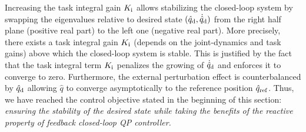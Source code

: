 Increasing the task integral gain $K_{\rm i}$ allows stabilizing the closed-loop system by swapping the eigenvalues relative to desired state $(\hat{q}_{\rm d}, \dot{\hat{q}}_{\rm d})$ from the right half plane (positive real part) to the left one (negative real part). More precisely, there exists a task integral gain $K_{\rm i}$ (depends on the joint-dynamics and task gains) above which the closed-loop system is stable. This is justified by the fact that the task integral term $K_{\rm i}$ penalizes the growing of $\dot{\hat{q}}_{\rm d}$ and enforces it to converge to zero. Furthermore, the external perturbation effect is counterbalanced by $\hat{q}_{\rm d}$ allowing $\hat{q}$ to converge asymptotically to the reference position $\hat{q}_{\rm ref}$. Thus, we have reached the control objective stated in the beginning of this section: \emph{ensuring the stability of the desired state while taking the benefits of the reactive property of feedback closed-loop QP controller.}

